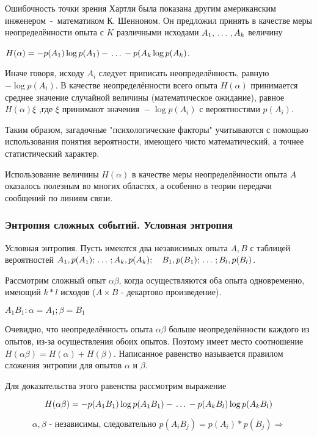 ﻿\documentclass[a4paper,12pt]{report}
\begin{document}
	Ошибочность точки зрения Хартли была показана другим американским инженером~-~математиком К. Шенноном. Он предложил принять в качестве меры неопределённости опыта с $K$ различными исходами $A_1,\,\ldots\,,A_k$ величину
	
	 $H(\alpha) = - p(A_1) \log p(A_1) - \,\ldots\, - p(A_k \log p(A_k)$. 
	
	Иначе говоря, исходу $A_i$ следует приписать неопределённость, равную $- \log p(A_i)$. В качестве неопределённости всего опыта $H(\alpha)$ принимается среднее значение случайной величины (математическое ожидание), равное $H(\alpha) \xi $ ,где $\xi \mbox{ принимают значения } - \log p(A_i) \mbox { с вероятностями } p(A_i)$.

	Таким образом, загадочные "психологические факторы" учитываются с помощью использования понятия вероятности, имеющего чисто математический, а точнее статистический характер.
	
	Использование величины $H(\alpha)$ в качестве меры неопределённости опыта $A$ оказалось полезным во многих областях, а особенно в теории передачи сообщений по линиям связи.

\subsubsection{Энтропия сложных событий. Условная энтропия}

	Условная энтропия. Пусть имеются два независимых опыта $A, B$ с таблицей вероятностей $A_1, p(A_1); \,\ldots\, ;A_k, p(A_k); \quad B_1, p(B_1); \,\ldots\, ;B_l, p(B_l)$.
	
	Рассмотрим сложный опыт $\alpha \beta$, когда осуществляются оба опыта одновременно, имеющий $k*l$ исходов ($A \times B$ - декартово произведение).

	$A_1B_1 : \alpha = A_1; \beta = B_1$

	Очевидно, что неопределённость опыта $\alpha \beta$ больше неопределённости каждого из опытов, из-за осуществления обоих опытов. Поэтому имеет место соотношение $H(\alpha\beta) = H(\alpha)+H(\beta)$. Написанное равенство называется правилом сложения энтропии для опытов $\alpha$ и $\beta$.

	Для доказательства этого равенства рассмотрим выражение 
	
	$$
	  H(\alpha\beta) = 
	    - p(A_1B_1) \log p(A_1 B_1) 
	    - \,\ldots\, 
	    - p(A_kB_l) \log p(A_k B_l)
	$$ 
	
	$$
	 \alpha, \beta \mbox{ - независимы, следовательно } 
	   p(A_iB_j) = p(A_i) * p(B_j) \Rightarrow
	$$
	
\end{document}
